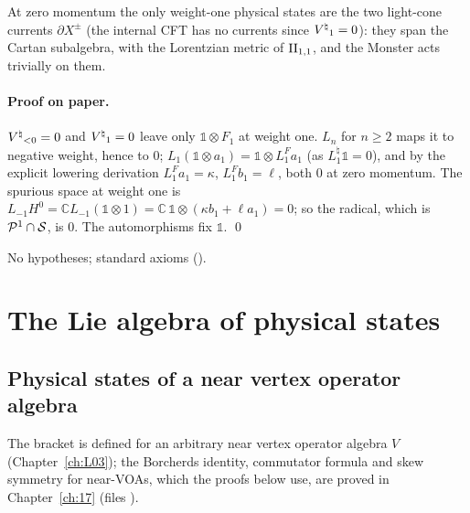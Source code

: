 \begin{physics}
At zero momentum the only weight-one physical states are the two light-cone currents $\partial X^\pm$
(the internal CFT has no currents since ${V^{\natural}}_1=0$): they span the Cartan subalgebra, with the
Lorentzian metric of $\mathrm{II}_{1,1}$, and the Monster acts trivially on them.
\end{physics}
\paragraph{Proof on paper.}  ${V^{\natural}}_{<0}=0$ and ${V^{\natural}}_1=0$ leave only $\mathbb 1\otimes F_1$ at weight one.  $L_n$ for $n\ge2$
maps it to negative weight, hence to $0$; $L_1(\mathbb 1\otimes a_1)=\mathbb 1\otimes L^F_1a_1$ (as $L^\natural_1\mathbb 1=0$), and by the explicit lowering derivation
$L^F_1a_1=\kappa$, $L^F_1b_1=\ell$, both $0$ at zero momentum.  The spurious space at weight
one is $L_{-1}H^0=\mathbb C L_{-1}(\mathbb 1\otimes1)=\mathbb C\,\mathbb 1\otimes(\kappa b_1+\ell a_1)=0$; so the radical, which is
$\mathcal{P}^1\cap\mathcal{S}$, is $0$.  The automorphisms fix $\mathbb 1$. \qed
\begin{status}No hypotheses; standard axioms ().\end{status}

\section{The Lie algebra of physical states}\label{ch18:sec:lie}

\subsection{Physical states of a near vertex operator algebra}

The bracket is defined for an arbitrary near vertex operator algebra $V$ (Chapter~\ref{ch:L03}); the Borcherds
identity, commutator formula and skew symmetry for near-VOAs, which the proofs below use, are proved in
Chapter~\ref{ch:17} (files ).

